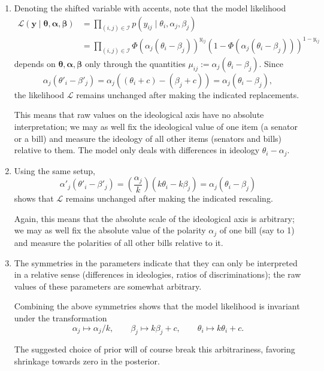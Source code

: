 \documentclass[12pt]{article}
\begin{document}
\begin{enumerate}
    \item Denoting the shifted variable with accents, note that the model
    likelihood
    \begin{align*}
        \mathcal{L}(\bm{y}\mid \bm{\theta}, \bm{\alpha}, \bm{\beta})
            &= \prod_{(i, j) \in \mathscr{I}} p(y_{ij}\mid \theta_i, \alpha_j, \beta_j) \\
            &= \prod_{(i, j) \in \mathscr{I}} \Phi(\alpha_j(\theta_i - \beta_j))^{y_{ij}}(1 - \Phi(\alpha_j(\theta_i - \beta_j)))^{1 - y_{ij}}
    \end{align*}
    depends on $\bm{\theta}, \bm{\alpha}, \bm{\beta}$ only through the
    quantities $\mu_{ij} := \alpha_j(\theta_i - \beta_j)$.
    Since \[
        \alpha_j(\theta'_i - \beta'_j)
            = \alpha_j((\theta_i + c) - (\beta_j + c))
            = \alpha_j(\theta_i - \beta_j),
    \] the likelihood $\mathcal{L}$ remains unchanged after making the
    indicated replacements.

    This means that raw values on the ideological axis have no absolute
    interpretation; we may as well fix the ideological value of one item (a
    senator or a bill) and measure the ideology of all other items (senators
    and bills) relative to them.
    The model only deals with differences in ideology $\theta_i - \alpha_j$.

    \item Using the same setup, \[
        \alpha'_j(\theta'_i - \beta'_j)
            = \left(\frac{\alpha_j}{k}\right)(k\theta_i - k\beta_j)
            = \alpha_j(\theta_i - \beta_j)
    \] shows that $\mathcal{L}$ remains unchanged after making the indicated
    rescaling.

    Again, this means that the absolute scale of the ideological axis is
    arbitrary; we may as well fix the absolute value of the polarity $\alpha_j$
    of one bill (say to 1) and measure the polarities of all other bills
    relative to it.


    \item The symmetries in the parameters indicate that they can only be
    interpreted in a relative sense (differences in ideologies, ratios of
    discriminations); the raw values of these parameters are somewhat
    arbitrary.

    Combining the above symmetries shows that the model likelihood is invariant
    under the transformation \[
        \alpha_j \mapsto \alpha_j/k, \qquad
        \beta_j \mapsto k\beta_j + c, \qquad
        \theta_i \mapsto k\theta_i + c.
    \]

    The suggested choice of prior will of course break this arbitrariness,
    favoring shrinkage towards zero in the posterior.


\end{enumerate}
\end{document}
